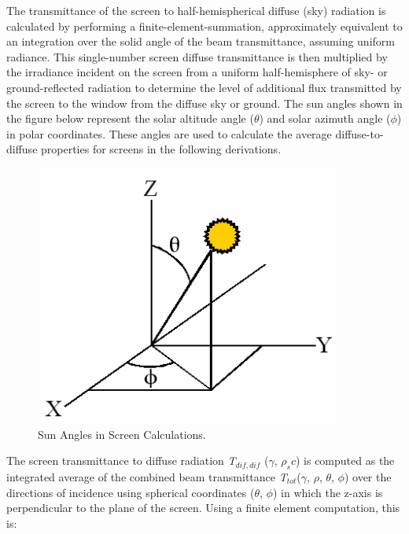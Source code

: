 The transmittance of the screen to half-hemispherical diffuse (sky) radiation is calculated by performing a finite-element-summation, approximately equivalent to an integration over the solid angle of the beam transmittance, assuming uniform radiance. This single-number screen diffuse transmittance is then multiplied by the irradiance incident on the screen from a uniform half-hemisphere of sky- or ground-reflected radiation to determine the level of additional flux transmitted by the screen to the window from the diffuse sky or ground. The sun angles shown in the figure below represent the solar altitude angle (\(\theta\)) and solar azimuth angle (\(\phi\)) in polar coordinates. These angles are used to calculate the average diffuse-to-diffuse properties for screens in the following derivations.

\begin{figure}[hbtp] %
\centering
\includegraphics[width=0.9\textwidth, height=0.9\textheight, keepaspectratio=true]{media/image1210.png}
\caption{Sun Angles in Screen Calculations. \protect \label{fig:sun-angles-in-screen-calculations.}}
\end{figure}

The screen transmittance to diffuse radiation \emph{T\(_{dif,dif}\)} (\(\gamma\), \(\rho_sc\)) is computed as the integrated average of the combined beam transmittance \emph{T\(_{tot}\)}(\(\gamma\), \(\rho\), \(\theta\), \(\phi\)) over the directions of incidence using spherical coordinates (\(\theta\), \(\phi\)) in which the z-axis is perpendicular to the plane of the screen. Using a finite element computation, this is:

